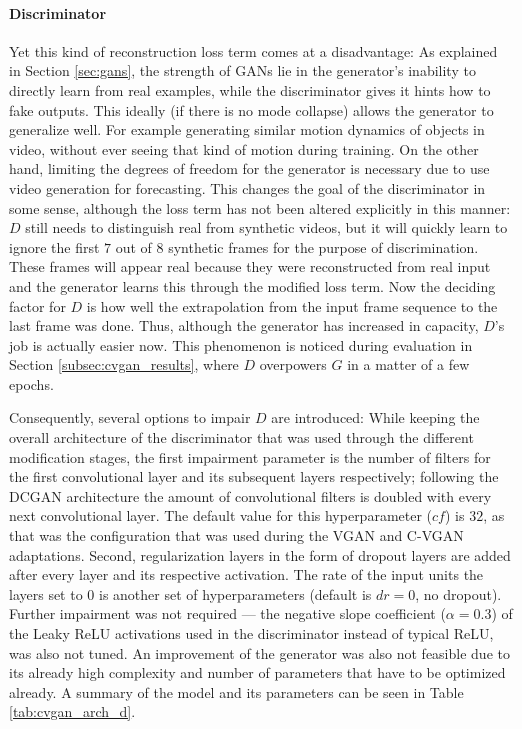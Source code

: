 \paragraph{Discriminator}
Yet this kind of reconstruction loss term comes at a disadvantage: As explained in Section \ref{sec:gans}, the strength of GANs lie in the generator's inability to directly learn from real examples, while the discriminator gives it hints how to fake outputs. This ideally (if there is no mode collapse) allows the generator to generalize well. For example generating similar motion dynamics of objects in video, without ever seeing that kind of motion during training. On the other hand, limiting the degrees of freedom for the generator is necessary due to use video generation for forecasting. This changes the goal of the discriminator in some sense, although the loss term has not been altered explicitly in this manner: $D$ still needs to distinguish real from synthetic videos, but it will quickly learn to ignore the first $7$ out of $8$ synthetic frames for the purpose of discrimination. These frames will appear real because they were reconstructed from real input and the generator learns this through the modified loss term. Now the deciding factor for $D$ is how well the extrapolation from the input frame sequence to the last frame was done. Thus, although the generator has increased in capacity, $D$'s job is actually easier now. This phenomenon is noticed during evaluation in Section \ref{subsec:cvgan_results}, where $D$ overpowers $G$ in a matter of a few epochs. 

Consequently, several options to impair $D$ are introduced: While keeping the overall architecture of the discriminator that was used through the different modification stages, the first impairment parameter is the number of filters for the first convolutional layer and its subsequent layers respectively; following the DCGAN architecture the amount of convolutional filters is doubled with every next convolutional layer. The default value for this hyperparameter ($cf$) is $32$, as that was the configuration that was used during the VGAN and C-VGAN adaptations. Second, regularization layers in the form of dropout layers are added after every layer and its respective activation. The rate of the input units the layers set to $0$ is another set of hyperparameters (default is $dr=0$, no dropout). Further impairment was not required --- the negative slope coefficient ($\alpha=0.3$) of the Leaky ReLU activations used in the discriminator instead of typical ReLU, was also not tuned. An improvement of the generator was also not feasible due to its already high complexity and number of parameters that have to be optimized already. A summary of the model and its parameters can be seen in Table \ref{tab:cvgan_arch_d}.



